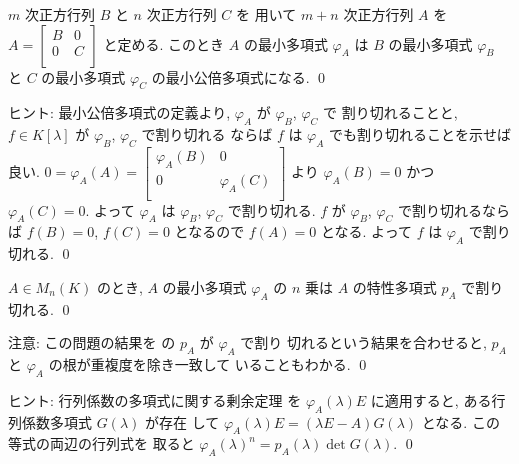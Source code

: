 \documentclass[12pt,twoside]{jarticle}
\begin{document}

\begin{question}
\label{q:minimal-polyn-8}
  $m$ 次正方行列 $B$ と $n$ 次正方行列 $C$ を
  用いて $m+n$ 次正方行列 $A$ を $A =
  \begin{bmatrix}
    B & 0 \\
    0 & C \\
  \end{bmatrix}$ と定める.  
  このとき $A$ の最小多項式 $\varphi_A$ 
  は $B$ の最小多項式 $\varphi_B$ と $C$ の最小多項式 $\varphi_C$ 
  の最小公倍多項式になる.
  \qed
\end{question}

\noindent
ヒント: 最小公倍多項式の定義より, $\varphi_A$ が $\varphi_B$, $\varphi_C$ で
割り切れることと, $f\in K[\lambda]$ が $\varphi_B$, $\varphi_C$ で割り切れる
ならば $f$ は $\varphi_A$ でも割り切れることを示せば良い.
$0=\varphi_A(A)= 
\begin{bmatrix}
  \varphi_A(B) & 0 \\
  0 & \varphi_A(C) \\
\end{bmatrix}$ より $\varphi_A(B)=0$ かつ $\varphi_A(C)=0$.  
よって $\varphi_A$ は $\varphi_B$, $\varphi_C$ で割り切れる.
$f$ が $\varphi_B$, $\varphi_C$ で割り切れるならば $f(B)=0$, $f(C)=0$ 
となるので $f(A) = 0$ となる.  よって $f$ は $\varphi_A$ で割り切れる.
\qed


\begin{question}
\label{q:minimal-polyn-7}
  $A\in M_n(K)$ のとき, 
  $A$ の最小多項式 $\varphi_A$ の $n$ 乗は $A$ の特性多項式 $p_A$ で割り切れる.
  \qed
\end{question}

\noindent
注意: この問題の結果を  の $p_A$ が $\varphi_A$ で割り
切れるという結果を合わせると, $p_A$ と $\varphi_A$ の根が重複度を除き一致して
いることもわかる.
\qed

\medskip
\noindent
ヒント: 
行列係数の多項式に関する剰余定理 
を $\varphi_A(\lambda)E$ に適用すると, ある行列係数多項式 $G(\lambda)$ が存在
して $\varphi_A(\lambda)E = (\lambda E - A)G(\lambda)$ となる.
この等式の両辺の行列式を
取ると $\varphi_A(\lambda)^n=p_A(\lambda)\det G(\lambda)$.
\qed

\end{document}
